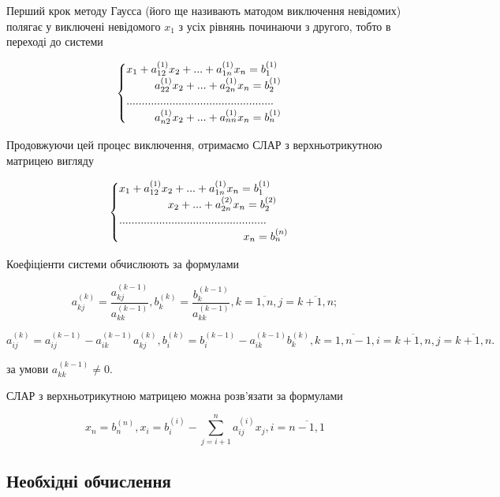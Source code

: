 \documentclass[a4paper, 12pt]{article}
\begin{document}
Перший крок методу Гаусса (його ще називають матодом виключення невідомих) полягає у виключені невідомого $x_1$ з усіх рівнянь починаючи з другого, тобто в переході до системи 

\[\begin{cases}
x_1 + a_{12}^{(1)}x_2 + ... + a_{1n}^{(1)}x_n = b_1^{(1)}\\
 \hspace{0.9cm} a_{22}^{(1)}x_2 + ... + a_{2n}^{(1)}x_n = b_2^{(1)}\\
................................................\\
 \hspace{0.9cm} a_{n2}^{(1)}x_2 + ... + a_{nn}^{(1)}x_n = b_n^{(1)}\\
\end{cases}\]

Продовжуючи цей процес виключення, отримаємо СЛАР з верхньотрикутною матрицею вигляду

\[\begin{cases}
x_1 + a_{12}^{(1)}x_2 + ... + a_{1n}^{(1)}x_n = b_1^{(1)}\\
 \hspace{1.55cm} x_2 + ... + a_{2n}^{(2)}x_n = b_2^{(2)}\\
................................................\\
 \hspace{3.95cm} x_n = b_n^{(n)}
\end{cases}\]

Коефіціенти системи обчислюють за формулами

\[ 
a_{kj}^{(k)} = \frac{a_{kj}^{(k-1)}}{a_{kk}^{(k-1)}}, b_{k}^{(k)} = \frac{b_{k}^{(k-1)}}{a_{kk}^{(k-1)}}, k = \overline{1, n}, j = \overline{k+1, n};
\]

\[
a_{ij}^{(k)} = a_{ij}^{(k-1)} - a_{ik}^{(k-1)}a_{kj}^{(k)}, b_{i}^{(k)} = b_{i}^{(k-1)} - a_{ik}^{(k-1)}b_{k}^{(k)}, k = \overline{1, n-1}, i = \overline{k+1, n}, j = \overline{k+1, n}.
\]

за умови $a_{kk}^{(k-1)} \neq 0$.

СЛАР з верхньотрикутною матрицею можна розв'язати за формулами

\[
x_n = b_{n}^{(n)}, x_i = b_{i}^{(i)} - \sum_{j = i+1}^{n}a_{ij}^{(i)}x_j, i = \overline{n-1, 1}
\]

\subsection{Необхідні обчислення}
\end{document}
